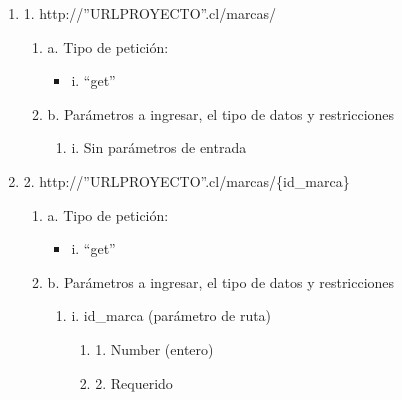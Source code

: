 \begin{enumerate}
    \item 1. http://”URLPROYECTO”.cl/marcas/
    \begin{enumerate}
        \item a. Tipo de petición:
            \begin{itemize}
               \item i. “get”
            \end{itemize}
        \item b. Parámetros a ingresar, el tipo de datos y restricciones
            \begin{enumerate}
                \item i. Sin parámetros de entrada
            \end{enumerate}
    \end{enumerate}

    \item 2. http://”URLPROYECTO”.cl/marcas/\{id\_marca\}
    \begin{enumerate}
        \item a. Tipo de petición:
            \begin{itemize}
               \item i. “get”
            \end{itemize}
        \item b. Parámetros a ingresar, el tipo de datos y restricciones
            \begin{enumerate}
                \item i. id\_marca (parámetro de ruta)
                    \begin{enumerate}
                        \item 1. Number (entero)
                        \item 2. Requerido
                    \end{enumerate}
            \end{enumerate}
    \end{enumerate}


\end{enumerate}
